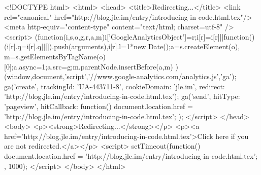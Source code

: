 <!DOCTYPE html>
<html>
<head>
<title>Redirecting...</title>
<link rel="canonical" href="http://blog.jle.im/entry/introducing-in-code.html.tex"/>
<meta http-equiv="content-type" content="text/html; charset=utf-8" />
<script>
(function(i,s,o,g,r,a,m){i['GoogleAnalyticsObject']=r;i[r]=i[r]||function(){
(i[r].q=i[r].q||[]).push(arguments)},i[r].l=1*new Date();a=s.createElement(o),
m=s.getElementsByTagName(o)[0];a.async=1;a.src=g;m.parentNode.insertBefore(a,m)
})(window,document,'script','//www.google-analytics.com/analytics.js','ga');
ga('create', { trackingId: 'UA-443711-8', cookieDomain: 'jle.im', redirect: 'http://blog.jle.im/entry/introducing-in-code.html.tex'});
ga('send', { hitType: 'pageview', hitCallback: function() { document.location.href = 'http://blog.jle.im/entry/introducing-in-code.html.tex'; } });
</script>
</head>
<body>
  <p><strong>Redirecting...</strong></p>
  <p><a href='http://blog.jle.im/entry/introducing-in-code.html.tex'>Click here if you are not redirected.</a></p>
  <script>
    setTimeout(function() { document.location.href = 'http://blog.jle.im/entry/introducing-in-code.html.tex'; }, 1000);
  </script>
</body>
</html>
